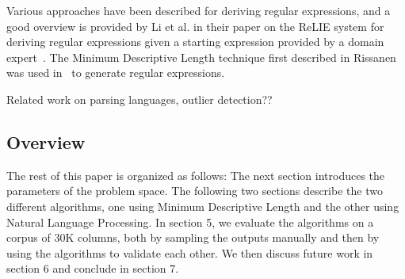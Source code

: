 Various approaches have been described for deriving regular expressions, and a good overview is provided by Li et al. in their paper on the ReLIE system for deriving regular expressions given a starting expression provided by a domain expert~\cite{Li:2008}. The Minimum Descriptive Length technique first described in Rissanen~\cite{Rissanen:1978} was used in~\cite{Raman:2001} to generate regular expressions. 

Related work on parsing languages, outlier detection??

\subsection{Overview}
The rest of this paper is organized as follows: The next section introduces the parameters of the problem space. The following two sections describe the two different algorithms, one using Minimum Descriptive Length and the other using Natural Language Processing. In section 5, we evaluate the algorithms on a corpus of 30K columns, both by sampling the outputs manually and then by using the algorithms to validate each other. We then discuss future work in section 6 and conclude in section 7.
